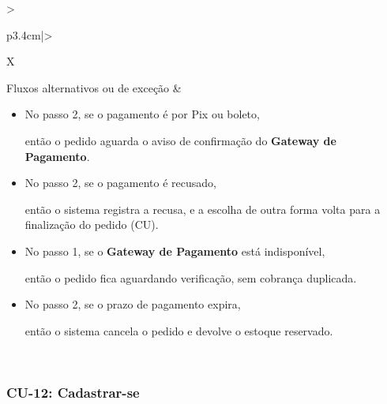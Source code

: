\documentclass[12pt,a4paper]{article}
\begin{document}
{\begin{xltabular}{\textwidth}{>{\raggedright\arraybackslash}p{3.4cm}|>{\raggedright\arraybackslash}X}
Fluxos alternativos ou de exceção & \begin{itemize}[nosep,leftmargin=2.2em,labelwidth=2.2em,labelsep=0pt,align=left,itemsep=4pt,before=\vspace{-\baselineskip},after=\vspace{-0.4\baselineskip}]\item[\textbf{A1}] No passo 2, se o pagamento é por Pix ou boleto,\par então o pedido aguarda o aviso de confirmação do \textbf{Gateway de Pagamento}. \item[\textbf{E1}] No passo 2, se o pagamento é recusado,\par então o sistema registra a recusa, e a escolha de outra forma volta para a finalização do pedido (CU). \item[\textbf{E2}] No passo 1, se o \textbf{Gateway de Pagamento} está indisponível,\par então o pedido fica aguardando verificação, sem cobrança duplicada. \item[\textbf{E3}] No passo 2, se o prazo de pagamento expira,\par então o sistema cancela o pedido e devolve o estoque reservado.\end{itemize}\\ \bottomrule
\end{xltabular}}

\Needspace{200pt}
\subsubsection{CU-12: Cadastrar-se}
\end{document}
